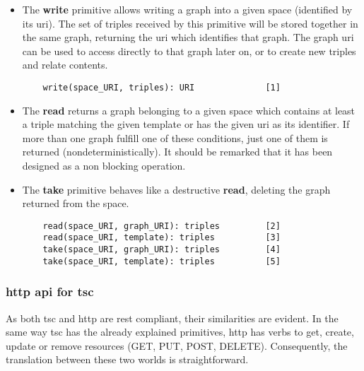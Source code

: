 \begin{itemize}
 \item The \textbf{write} primitive allows writing a graph into a given space (identified by its \acs{uri}).
	The set of triples received by this primitive will be stored together in the same graph, returning the \acs{uri} which identifies that graph.
	The graph \acs{uri} can be used to access directly to that graph later on, or to create new triples and relate contents.

  \begin{lstlisting}
    write(space_URI, triples): URI              [1]
  \end{lstlisting}


  \item The \textbf{read} returns a graph belonging to a given space which contains at least a triple matching the given template or has the given \acs{uri} as its identifier.
	If more than one graph fulfill one of these conditions, just one of them is returned (nondeterministically).
	It should be remarked that it has been designed as a non blocking operation.
  \item The \textbf{take} primitive behaves like a destructive \textbf{read}, deleting the graph returned from the space.

  \begin{lstlisting}
    read(space_URI, graph_URI): triples         [2]
    read(space_URI, template): triples          [3]
    take(space_URI, graph_URI): triples         [4]
    take(space_URI, template): triples          [5]
  \end{lstlisting}

\end{itemize}



\subsubsection{\acs{http} \acs{api} for \acs{tsc}}
\label{sec:httpapi}

As both \ac{tsc} and \ac{http} are \ac{rest} compliant, their similarities are evident.
In the same way \ac{tsc} has the already explained primitives, \ac{http} has verbs to get, create, update or remove resources (GET, PUT, POST, DELETE).
Consequently, the translation between these two worlds is straightforward.

